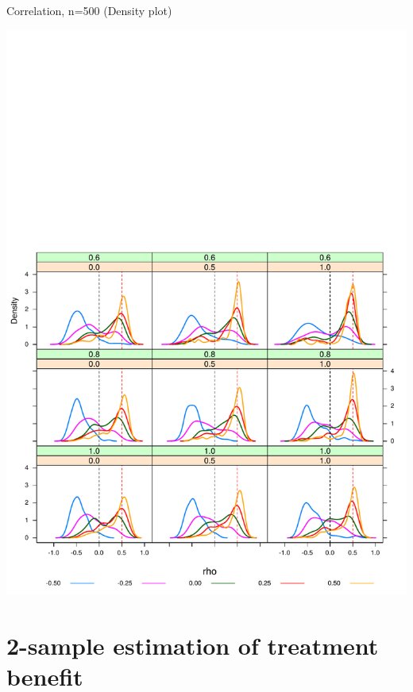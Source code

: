\begin{frame}{Correlation, n=500 (Density plot)}

\begin{center}
  \includegraphics[trim= 0cm 0cm 0cm 11.75cm, clip, scale=0.47]{Figure1/tbl1densityPlot_n500.pdf} %
\end{center}

\end{frame}

\section{{2-sample} estimation of treatment benefit}
\protect\hypertarget{two-samples}{}

